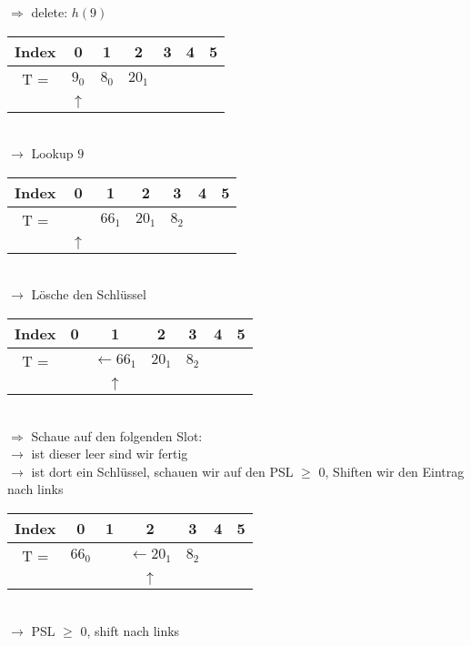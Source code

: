 $\Rightarrow$ delete: $h(9)$
\begin{multicols}{2}
\begin{center}


\begin{tabular}{|c|c|c|c|c|c|c|}
\hline
Index & 0 & 1 & 2 & 3 & 4 & 5\\
\hline
T = & $9_0$ & $8_0$ & $20_1$ & & &\\
\hline
& $\uparrow$ &  & & & &\\
\hline
\end{tabular}\\
$\rightarrow$ Lookup $9$
\end{center}

\begin{center}
\begin{tabular}{|c|c|c|c|c|c|c|}
\hline
Index & 0 & 1 & 2 & 3 & 4 & 5\\
\hline
T = &  & $66_1$ & $20_1$ & $8_2$ & &\\
\hline
& $\uparrow$ &  &  & & &\\
\hline
\end{tabular}\\
$\rightarrow$ Lösche den Schlüssel
\end{center}

\begin{center}
\begin{tabular}{|c|c|c|c|c|c|c|}
\hline
Index & 0 & 1 & 2 & 3 & 4 & 5\\
\hline
T = &  & $\leftarrow 66_1$ & $20_1$ & $8_2$ & &\\
\hline
&  & $\uparrow$ &  & & &\\
\hline
\end{tabular}\\
$\Rightarrow$ Schaue auf den folgenden Slot:\\
$\rightarrow$ ist dieser leer sind wir fertig\\
$\rightarrow$ ist dort ein Schlüssel, schauen wir auf den PSL $\geq$ 0, Shiften wir den Eintrag nach links
\end{center}

\columnbreak
\begin{center}
\begin{tabular}{|c|c|c|c|c|c|c|}
\hline
Index & 0 & 1 & 2 & 3 & 4 & 5\\
\hline
T = & $66_0$ &  & $\leftarrow 20_1$ & $8_2$ & &\\
\hline
&  &  & $\uparrow$ & & &\\
\hline
\end{tabular}\\
$\rightarrow$ PSL $\geq$ 0, shift nach links\\
\end{center}



\end{multicols}
